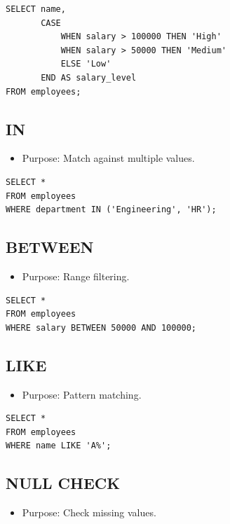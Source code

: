 \documentclass[10pt]{article}
\begin{document}
\begin{verbatim}
SELECT name,
       CASE
           WHEN salary > 100000 THEN 'High'
           WHEN salary > 50000 THEN 'Medium'
           ELSE 'Low'
       END AS salary_level
FROM employees;
\end{verbatim}

\subsection{IN}
\begin{itemize}
    \item Purpose: Match against multiple values.
\end{itemize}

\begin{verbatim}
SELECT *
FROM employees
WHERE department IN ('Engineering', 'HR');
\end{verbatim}

\subsection{BETWEEN}
\begin{itemize}
    \item Purpose: Range filtering.
\end{itemize}

\begin{verbatim}
SELECT *
FROM employees
WHERE salary BETWEEN 50000 AND 100000;
\end{verbatim}

\subsection{LIKE}
\begin{itemize}
    \item Purpose: Pattern matching.
\end{itemize}

\begin{verbatim}
SELECT *
FROM employees
WHERE name LIKE 'A%';
\end{verbatim}

\subsection{NULL CHECK}
\begin{itemize}
    \item Purpose: Check missing values.
\end{itemize}
\end{document}
